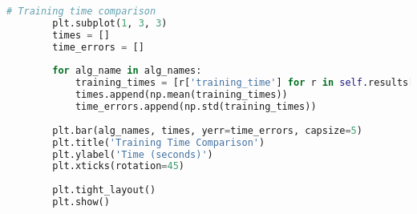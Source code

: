 \begin{lstlisting}[language=Python, caption=Algorithm Comparison]
        # Training time comparison
        plt.subplot(1, 3, 3)
        times = []
        time_errors = []
        
        for alg_name in alg_names:
            training_times = [r['training_time'] for r in self.results[alg_name]]
            times.append(np.mean(training_times))
            time_errors.append(np.std(training_times))
        
        plt.bar(alg_names, times, yerr=time_errors, capsize=5)
        plt.title('Training Time Comparison')
        plt.ylabel('Time (seconds)')
        plt.xticks(rotation=45)
        
        plt.tight_layout()
        plt.show()
\end{lstlisting}